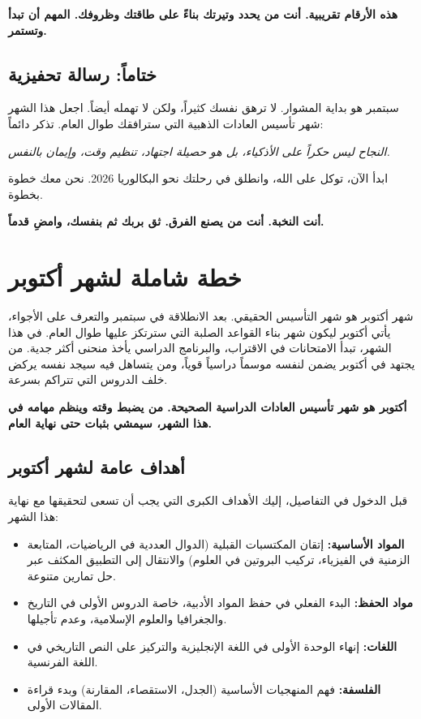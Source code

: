 \documentclass[12pt,a4paper]{book}
\newcommand{\quoteAr}[1]{%
	\begin{myquote}
		\itshape #1
	\end{myquote}
}
\newcommand{\importantAr}[1]{%
	\begin{important}
		\bfseries #1
	\end{important}
}
\begin{document}
	\importantAr{هذه الأرقام تقريبية. أنت من يحدد وتيرتك بناءً على طاقتك وظروفك. المهم أن تبدأ وتستمر.}
	
	\subsection{ختاماً: رسالة تحفيزية}
	
	سبتمبر هو بداية المشوار. لا ترهق نفسك كثيراً، ولكن لا تهمله أيضاً. اجعل هذا الشهر شهر تأسيس العادات الذهبية التي سترافقك طوال العام. تذكر دائماً:
	
	\quoteAr{النجاح ليس حكراً على الأذكياء، بل هو حصيلة اجتهاد، تنظيم وقت، وإيمان بالنفس.}
	
	ابدأ الآن، توكل على الله، وانطلق في رحلتك نحو البكالوريا 2026. نحن معك خطوة بخطوة.
	
	\importantAr{أنت النخبة. أنت من يصنع الفرق. ثق بربك ثم بنفسك، وامضِ قدماً.}
	
	
	
	\section{خطة شاملة لشهر أكتوبر}
	
	شهر أكتوبر هو شهر التأسيس الحقيقي. بعد الانطلاقة في سبتمبر والتعرف على الأجواء، يأتي أكتوبر ليكون شهر بناء القواعد الصلبة التي سترتكز عليها طوال العام. في هذا الشهر، تبدأ الامتحانات في الاقتراب، والبرنامج الدراسي يأخذ منحنى أكثر جدية. من يجتهد في أكتوبر يضمن لنفسه موسماً دراسياً قوياً، ومن يتساهل فيه سيجد نفسه يركض خلف الدروس التي تتراكم بسرعة.
	
	\importantAr{أكتوبر هو شهر تأسيس العادات الدراسية الصحيحة. من يضبط وقته وينظم مهامه في هذا الشهر، سيمشي بثبات حتى نهاية العام.}
	
	\subsection{أهداف عامة لشهر أكتوبر}
	
	قبل الدخول في التفاصيل، إليك الأهداف الكبرى التي يجب أن تسعى لتحقيقها مع نهاية هذا الشهر:
	
	\begin{itemize}
		\item \textbf{المواد الأساسية:} إتقان المكتسبات القبلية (الدوال العددية في الرياضيات، المتابعة الزمنية في الفيزياء، تركيب البروتين في العلوم) والانتقال إلى التطبيق المكثف عبر حل تمارين متنوعة.
		\item \textbf{مواد الحفظ:} البدء الفعلي في حفظ المواد الأدبية، خاصة الدروس الأولى في التاريخ والجغرافيا والعلوم الإسلامية، وعدم تأجيلها.
		\item \textbf{اللغات:} إنهاء الوحدة الأولى في اللغة الإنجليزية  والتركيز على النص التاريخي في اللغة الفرنسية.
		\item \textbf{الفلسفة:} فهم المنهجيات الأساسية (الجدل، الاستقصاء، المقارنة) وبدء قراءة المقالات الأولى.
	\end{itemize}
	
\end{document}
